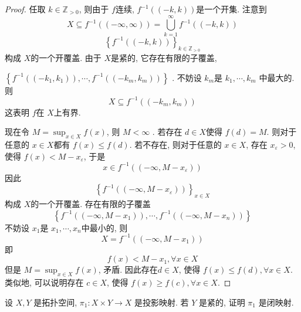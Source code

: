 \documentclass[../main.tex]{subfiles}
\begin{document}
\begin{proof}
    任取 \(  k \in \mathbb{Z} _{> 0}  \), 则由于 \(  f  \)连续, \(  f^{-1} \left( \left( -k,k \right)  \right)   \)是一个开集. 注意到 \[
    X\subseteq f^{-1} \left( \left( -\infty,\infty \right)  \right)=  \bigcup _{k = 1}^{\infty}f^{-1} \left( \left( -k,k \right)  \right)  
    \] \[
    \left\{ f^{-1} \left( \left( -k,k \right)  \right)  \right\}_{k\in \mathbb{Z} _{> 0}}
    \]   构成 \(  X  \)的一个开覆盖.  由于 \(  X  \)是紧的, 它存在有限的子覆盖,
    
    \(  \left\{ f^{-1} \left( \left( -k_1,k_1\right)  \right),\cdots ,f^{-1} \left( \left( -k_{m},k_{m} \right)  \right)   \right\}  \)   . 不妨设 \(  k_{m}  \)是 \(  k_1,\cdots ,k_{m}  \)  中最大的. 则 \[
    X\subseteq f^{-1} \left( \left( -k_{m},k_{m} \right)  \right) 
    \]这表明 \(  f  \)在 \(  X  \)上有界.

    现在令 \(  M= \sup _{x\in X}f\left( x \right)   \), 则 \(  M< \infty  \) . 若存在 \(  d \in X  \)使得 \(  f\left( d \right)= M   \). 则对于任意的 \(  x \in X  \)都有 \(  f\left( x \right)\le f\left( d \right)    \). 若不存在,     则对于任意的 \(  x \in X  \), 存在 \(  x_{ \varepsilon }> 0  \), 使得 \(  f\left( x \right)< M-x_{ \varepsilon }   \), 于是 \[
     x\in f^{-1} \left( \left( -\infty, M-x_{ \varepsilon } \right)  \right) 
    \]  因此 \[
    \left\{ f^{-1} \left( \left( -\infty,M-x_{ \varepsilon } \right)  \right)  \right\}_{x\in X}
    \]构成 \(  X  \)的一个开覆盖. 存在有限的子覆盖 \[
    \left\{ f^{-1} \left( \left( -\infty,M-x_1 \right)  \right),\cdots ,f^{-1} \left( \left( -\infty,M-x_{n} \right)  \right)   \right\}
    \] 不妨设 \(  x_1  \)是 \(  x_1,\cdots ,x_{n}  \)中最小的, 则 \[
    X= f^{-1} \left( \left( -\infty,M-x_1 \right)  \right) 
    \]即 \[
    f\left( x \right)< M-x_1,\forall x \in X 
    \]  但是 \(  M= \sup _{x\in X}f\left( x \right)   \), 矛盾. 因此存在\( d \in X  \), 使得 \(  f\left( x \right)\le f\left( d \right), \forall x\in X    \). 类似地, 可以说明存在 \(  c\in X  \), 使得 \(  f\left( x \right)\ge f\left( c \right), \forall x \in X    \).     
\end{proof}
\begin{exercise}{}{}
设 $X, Y$ 是拓扑空间, $\pi_1: X \times Y \to X$ 是投影映射. 若 $Y$ 是紧的, 证明 $\pi_1$ 是闭映射.
\end{exercise}
\end{document}
